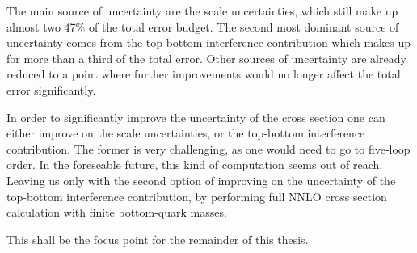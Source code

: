 The main source of uncertainty are the scale uncertainties, which still make up almost two 47\% of the total error budget. The second most dominant source of uncertainty comes from the top-bottom interference contribution which makes up for more than a third of the total error. Other sources of uncertainty are already reduced to a point where further improvements would no longer affect the total error significantly.

In order to significantly improve the uncertainty of the cross section one can either improve on the scale uncertainties, or the top-bottom interference contribution. The former is very challenging, as one would need to go to five-loop order. In the foreseable future, this kind of computation seems out of reach. Leaving us only with the second option of improving on the uncertainty of the top-bottom interference contribution, by performing full \acs{NNLO} cross section calculation with finite bottom-quark masses.

This shall be the focus point for the remainder of this thesis.
